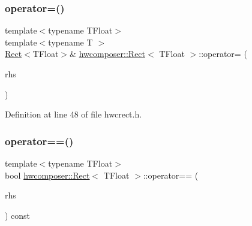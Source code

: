 \subsubsection{\texorpdfstring{operator=()}{operator=()}}
{\footnotesize\ttfamily template$<$typename T\+Float$>$ \\
template$<$typename T $>$ \\
\mbox{\hyperlink{structhwcomposer_1_1Rect}{Rect}}$<$T\+Float$>$\& \mbox{\hyperlink{structhwcomposer_1_1Rect}{hwcomposer\+::\+Rect}}$<$ T\+Float $>$\+::operator= (\begin{DoxyParamCaption}\item[{const \mbox{\hyperlink{structhwcomposer_1_1Rect}{Rect}}$<$ T $>$ \&}]{rhs }\end{DoxyParamCaption})\hspace{0.3cm}{\ttfamily [inline]}}



Definition at line 48 of file hwcrect.\+h.


\begin{DoxyCode}{0}
\end{DoxyCode}
\mbox{\label{structhwcomposer_1_1Rect_a7c600a50d058b86fb3984bf1f0ce57c3}} 
\subsubsection{\texorpdfstring{operator==()}{operator==()}}
{\footnotesize\ttfamily template$<$typename T\+Float$>$ \\
bool \mbox{\hyperlink{structhwcomposer_1_1Rect}{hwcomposer\+::\+Rect}}$<$ T\+Float $>$\+::operator== (\begin{DoxyParamCaption}\item[{const \mbox{\hyperlink{structhwcomposer_1_1Rect}{Rect}}$<$ T\+Float $>$ \&}]{rhs }\end{DoxyParamCaption}) const\hspace{0.3cm}{\ttfamily [inline]}}



